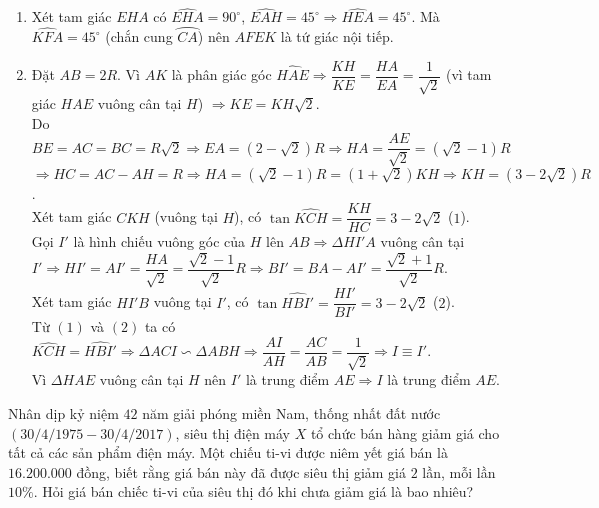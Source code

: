\begin{ex}
{\begin{enumerate}
Ta có $\widehat{DBC}=\widehat{DAC}=22,5^{\circ}$ (cùng chắn cung $\wideparen{CD}$).\\
Xét tam giác $BCM$ có $\widehat{BCM}=90^{\circ}$, $\widehat{CBM}=22,5^{\circ}\Rightarrow \widehat{BMC}=67,5^{\circ}$.
\item Xét tam giác $EHA$ có $\widehat{EHA}=90^{\circ}$, $\widehat{EAH}=45^{\circ}\Rightarrow \widehat{HEA}=45^{\circ}$. Mà $\widehat{KFA}=45^{\circ}$ (chắn cung $\wideparen{CA}$) nên $AFEK$ là tứ giác nội tiếp.
\item Đặt $AB=2R$. Vì $AK$ là phân giác góc $\widehat{HAE}\Rightarrow \dfrac{KH}{KE}=\dfrac{HA}{EA}=\dfrac{1}{\sqrt{2}}$ (vì tam giác $HAE$ vuông cân tại $H$) $\Rightarrow KE=KH\sqrt{2}$.\\
Do $BE=AC=BC=R\sqrt{2}\Rightarrow EA=(2-\sqrt{2})R\Rightarrow HA=\dfrac{AE}{\sqrt{2}}=(\sqrt{2}-1)R$\\
$\Rightarrow HC=AC-AH=R\Rightarrow HA=(\sqrt{2}-1)R=(1+\sqrt{2})KH\Rightarrow KH=(3-2\sqrt{2})R$.\\
Xét tam giác $CKH$ (vuông tại $H$), có $\tan\widehat{KCH}=\dfrac{KH}{HC}=3-2\sqrt{2}$ ($1$).\\
Gọi $I'$ là hình chiếu vuông góc của $H$ lên $AB\Rightarrow \Delta HI'A$ vuông cân tại $I'\Rightarrow HI'=AI'=\dfrac{HA}{\sqrt{2}}=\dfrac{\sqrt{2}-1}{\sqrt{2}}R\Rightarrow BI'=BA-AI'=\dfrac{\sqrt{2}+1}{\sqrt{2}}R$.\\
Xét tam giác $HI'B$ vuông tại $I'$, có $\tan\widehat{HBI'}=\dfrac{HI'}{BI'}=3-2\sqrt{2}$ ($2$).\\
Từ $(1)$ và $(2)$ ta có $\widehat{KCH}=\widehat{HBI'}\Rightarrow \Delta ACI\backsim\Delta ABH\Rightarrow \dfrac{AI}{AH}=\dfrac{AC}{AB}=\dfrac{1}{\sqrt{2}}\Rightarrow I\equiv I'$.\\
Vì $\Delta HAE$ vuông cân tại $H$ nên $I'$ là trung điểm $AE\Rightarrow I$ là trung điểm $AE$.
\end{enumerate}
}
\end{ex}
\begin{ex}%
Nhân dịp kỷ niệm $42$ năm giải phóng miền Nam, thống nhất đất nước $(30/4/1975-30/4/2017)$, siêu thị điện máy $X$ tổ chức bán hàng giảm giá cho tất cả các sản phẩm điện máy. Một chiếu ti-vi được niêm yết giá bán là $16.200.000$ đồng, biết rằng giá bán này đã được siêu thị giảm giá $2$ lần, mỗi lần $10\%$. Hỏi giá bán chiếc ti-vi của siêu thị đó khi chưa giảm giá là bao nhiêu?
\end{ex}
